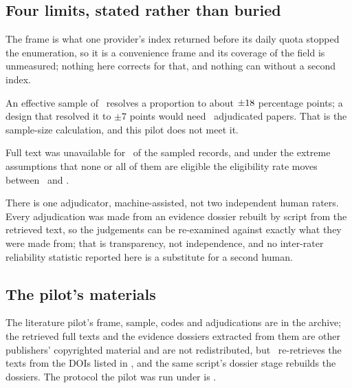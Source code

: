 \subsection*{Four limits, stated rather than buried}

The frame is what one provider's index returned before its daily quota stopped
the enumeration, so it is a convenience frame and its coverage of the field is
unmeasured; nothing here corrects for that, and nothing can without a second
index.

An effective sample of \nAuditEffective\ resolves a proportion to about
$\pm18$ percentage points; a design that resolved it to
$\pm 7$ points would need \nAuditRequired\ adjudicated papers. That is the
sample-size calculation, and this pilot does not meet it.

Full text was unavailable for \nAuditNoFullText\ of the sampled records, and
under the extreme assumptions that none or all of them are eligible the
eligibility rate moves between \auditBoundLo\ and \auditBoundHi.

There is one adjudicator, machine-assisted, not two independent human raters.
Every adjudication was made from an evidence dossier rebuilt by script from the retrieved
text, so the judgements can be re-examined against exactly what they
were made from; that is transparency, not independence, and no inter-rater
reliability statistic reported here is a substitute for a second human.

\subsection*{The pilot's materials}

The literature pilot's frame, sample, codes and adjudications are in the
archive; the retrieved full texts and the evidence dossiers extracted from
them are other publishers' copyrighted material and are not redistributed,
but \pilotfetch\ re-retrieves the texts from the DOIs listed in
\pilotsamplefile, and the same script's dossier stage rebuilds the dossiers.
The protocol the pilot was run under is \pilotprotocolfile.
